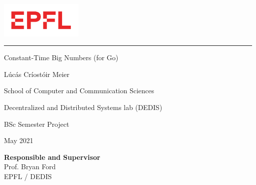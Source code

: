 
%        




\newcommand{\logoepfl}[0]{
  \begin{center}
    \includegraphics[width=4cm]{EPFLlogo.pdf}
  \end{center}
  \hrule
}
\newcommand{\project}[1]{
  \begin{center}
    \large{#1}
  \end{center}
  \vspace{1cm}
}
\newcommand{\department}[1]{
  \begin{center}
    \large{#1}
  \end{center}
}
\newcommand{\lab}[1]{
  \begin{center}
    \large{#1}
  \end{center}
}
\newcommand{\supervisor}[3]{
  \begin{center}
    \begin{normalsize}{
        \bf #1}\\#2\\#3
    \end{normalsize}
  \end{center}
}
\renewcommand{\author}[1]{
  \begin{center}
    \Large{#1}
  \end{center}
  \vspace{0.5cm}
}
\renewcommand{\title}[1]{
  \vspace{3cm}
  \begin{center}
    \huge{#1}
  \end{center}
  \vspace{1.7cm}
}
\renewcommand{\date}[2]{
  \begin{center}
    \normalsize{#1 #2}
  \end{center}
  \vspace{0.5cm}
}

\thispagestyle{empty}


\logoepfl

\title{Constant-Time Big Numbers (for Go)}

\author{Lúcás Críostóir Meier}
\department{School of Computer and Communication Sciences}
\lab{Decentralized and Distributed Systems lab (DEDIS)}
\project{BSc Semester Project}

\date{May}{2021}

\begin{center}
  \supervisor{Responsible and Supervisor}{Prof. Bryan Ford}{EPFL / DEDIS}
\end{center}


